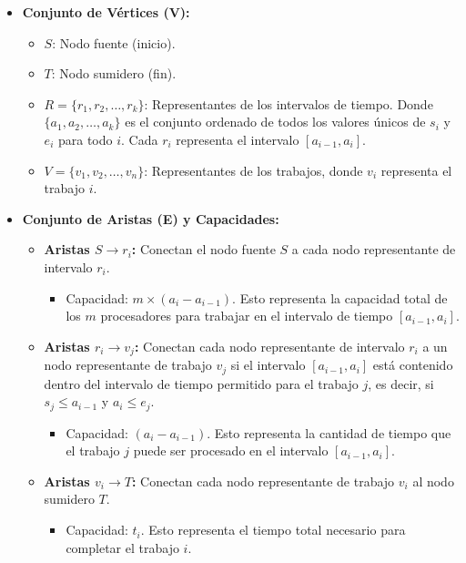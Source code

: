 \documentclass[14pt]{extarticle}
\begin{document}
\begin{itemize}
    \item \textbf{Conjunto de Vértices (V):}
    \begin{itemize}
        \item $S$: Nodo fuente (inicio).
        \item $T$: Nodo sumidero (fin).
        \item $R = \{r_1, r_2, \ldots, r_k\}$: Representantes de los intervalos de tiempo. Donde $\{a_1, a_2, \ldots, a_k\}$ es el conjunto ordenado de todos los valores únicos de $s_i$ y $e_i$ para todo $i$. Cada $r_i$ representa el intervalo $[a_{i-1}, a_i]$.
        \item $V = \{v_1, v_2, \ldots, v_n\}$: Representantes de los trabajos, donde $v_i$ representa el trabajo $i$.
    \end{itemize}
    \item \textbf{Conjunto de Aristas (E) y Capacidades:}
    \begin{itemize}
        \item \textbf{Aristas $S \rightarrow r_i$:} Conectan el nodo fuente $S$ a cada nodo representante de intervalo $r_i$.
            \begin{itemize}
                \item Capacidad: $m \times (a_i - a_{i-1})$. Esto representa la capacidad total de los $m$ procesadores para trabajar en el intervalo de tiempo $[a_{i-1}, a_i]$.
            \end{itemize}
        \item \textbf{Aristas $r_i \rightarrow v_j$:} Conectan cada nodo representante de intervalo $r_i$ a un nodo representante de trabajo $v_j$ si el intervalo $[a_{i-1}, a_i]$ está contenido dentro del intervalo de tiempo permitido para el trabajo $j$, es decir, si $s_j \leq a_{i-1}$ y $a_i \leq e_j$.
            \begin{itemize}
                \item Capacidad: $(a_i - a_{i-1})$. Esto representa la cantidad de tiempo que el trabajo $j$ puede ser procesado en el intervalo $[a_{i-1}, a_i]$.
            \end{itemize}
        \item \textbf{Aristas $v_i \rightarrow T$:} Conectan cada nodo representante de trabajo $v_i$ al nodo sumidero $T$.
            \begin{itemize}
                \item Capacidad: $t_i$. Esto representa el tiempo total necesario para completar el trabajo $i$.
            \end{itemize}
    \end{itemize}
\end{itemize}
\end{document}
